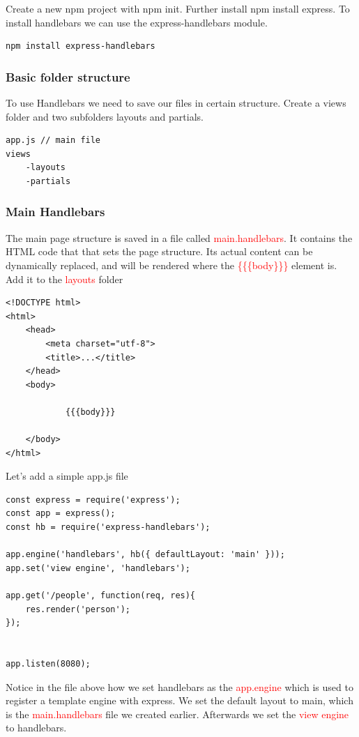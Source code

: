 \documentclass[a4paper]{article}
\begin{document}
Create a new npm project with npm init. Further install npm install express. To install handlebars we can use the express-handlebars module.\\
\begin{lstlisting}
npm install express-handlebars
\end{lstlisting}
\subsubsection{Basic folder structure}
To use Handlebars we need to save our files in certain structure. Create a views folder and two subfolders layouts and partials.
\begin{lstlisting}
app.js // main file
views
    -layouts
    -partials
\end{lstlisting}
\subsubsection{Main Handlebars}
The main page structure is saved in a file called \textcolor{red}{main.handlebars}. It contains the HTML code that that sets the page structure. Its actual content can be dynamically replaced, and will be rendered where the  \textcolor{red}{\{\{\{body\}\}\}} element is. Add it to the \textcolor{red}{layouts} folder
\begin{lstlisting}
<!DOCTYPE html>
<html>
    <head>
        <meta charset="utf-8">
        <title>...</title>
    </head>
    <body>
        
            {{{body}}}
        
    </body>
</html>
\end{lstlisting}
Let's add a simple app.js file
\begin{lstlisting}
const express = require('express');
const app = express();
const hb = require('express-handlebars');

app.engine('handlebars', hb({ defaultLayout: 'main' }));
app.set('view engine', 'handlebars');

app.get('/people', function(req, res){
    res.render('person');
});


app.listen(8080);
\end{lstlisting}
Notice in the file above how we set handlebars as the \textcolor{red}{app.engine} which is used to register a template engine with express. We set the default layout to main, which is the \textcolor{red}{main.handlebars} file we created earlier. Afterwards we set the \textcolor{red}{view engine} to handlebars.\\
\end{document}
